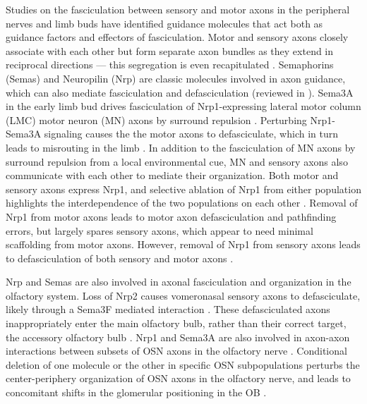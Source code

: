 Studies on the fasciculation between sensory and motor axons in the peripheral nerves and limb buds have identified guidance molecules that act both as guidance factors and effectors of fasciculation.
Motor and sensory axons closely associate with each other but form separate axon bundles as they extend in reciprocal directions --- this segregation is even recapitulated \invitro{} \cite{gallarda2008segregation}.
Semaphorins (Semas) and Neuropilin (Nrp) are classic molecules involved in axon guidance, which can also mediate fasciculation and defasciculation (reviewed in ).
Sema3A in the early limb bud drives fasciculation of Nrp1-expressing lateral motor column (LMC) motor neuron (MN) axons by surround repulsion \cite{huber2005distinct}.
Perturbing Nrp1-Sema3A signaling causes the the motor axons to defasciculate, which in turn leads to misrouting in the limb \cite{huber2005distinct}.
In addition to the fasciculation of MN axons by surround repulsion from a local environmental cue, MN and sensory axons also communicate with each other to mediate their organization.
Both motor and sensory axons express Nrp1, and selective ablation of Nrp1 from either population highlights the interdependence of the two populations on each other \cite{huettl2011npn}.
Removal of Nrp1 from motor axons leads to motor axon defasciculation and pathfinding errors, but largely spares sensory axons, which appear to need minimal scaffolding from motor axons.
However, removal of Nrp1 from sensory axons leads to defasciculation of both sensory and motor axons \cite{huettl2011npn}.

Nrp and Semas are also involved in axonal fasciculation and organization in the olfactory system.
Loss of Nrp2 causes vomeronasal sensory axons to defasciculate, likely through a Sema3F mediated interaction \cite{cloutier2002neuropilin}.
These defasciculated axons inappropriately enter the main olfactory bulb, rather than their correct target, the accessory olfactory bulb \cite{cloutier2002neuropilin}.
Nrp1 and Sema3A are also involved in axon-axon interactions between subsets of OSN axons in the olfactory nerve \cite{imai2009pre}.
Conditional deletion of one molecule or the other in specific OSN subpopulations perturbs the center-periphery organization of OSN axons in the olfactory nerve, and leads to concomitant shifts in the glomerular positioning in the OB \cite{imai2009pre}.

